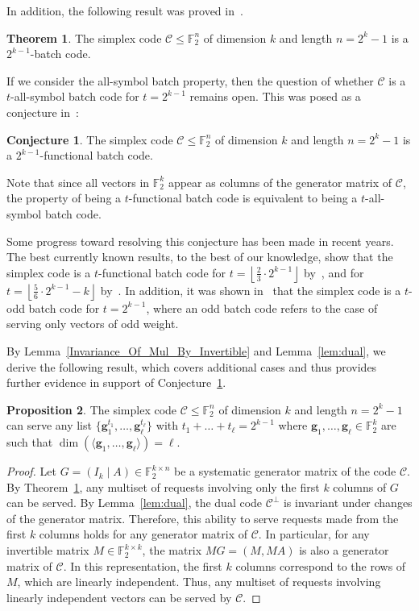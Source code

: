 \documentclass[11pt,a4paper]{article}
\theoremstyle{definition}
\newtheorem{theorem}{Theorem}
\newtheorem{proposition}[theorem]{Proposition}
\newtheorem{conjecture}{Conjecture}
\newcommand{\bfg}{{\boldsymbol g}}
\newcommand{\F}{\mathbb{F}}
\newcommand{\mC}{\mathcal{C}}
\begin{document}
In addition, the following result was proved in~\cite[Lemma 12]{wang2017switch}.

\begin{theorem} \label{thm:simba}
The simplex code $\mC \le \F_2^n$ of dimension $k$ and length $n=2^k-1$ is a $2^{k-1}$-batch code.
\end{theorem}

If we consider the all-symbol batch property, then the question of whether $\mC$ is a $t$-all-symbol batch code for $t=2^{k-1}$ remains open. This was posed as a conjecture in~\cite{YAAKOBI2020}:

\begin{conjecture} \label{conj:eit}
    The simplex code $\mC \le \F_2^n$ of dimension $k$ and length $n=2^k-1$ is a $2^{k-1}$-functional batch code.
\end{conjecture}

Note that since all vectors in $\F_2^k$ appear as columns of the generator matrix of $\mC$, the property of being a $t$-functional batch code is equivalent to being a $t$-all-symbol batch code.

Some progress toward resolving this conjecture has been made in recent years. The best currently known results, to the best of our knowledge, show that the simplex code is a $t$-functional batch code for $t=\left\lfloor \frac{2}{3}\cdot 2^{k-1}\right\rfloor $
by~\cite{yohananov2021}, and for
$
t=\left\lfloor \frac{5}{6}\cdot 2^{k-1}-k \right\rfloor$
by~\cite{yohananov2022}. In addition, it was shown in~\cite{hollmann2023} that the simplex code is a $t$-odd batch code for $t=2^{k-1}$, where an odd batch code refers to the case of serving only vectors of odd weight.


By Lemma~\ref{Invariance_Of_Mul_By_Invertible} and Lemma~\ref{lem:dual}, we derive the following result, which covers additional cases and thus provides further evidence in support of Conjecture~\ref{conj:eit}.

\begin{proposition}
    The simplex code $\mC \le \F_2^n$ of dimension $k$ and length $n=2^k-1$ can serve any list $\{\bfg_1^{t_1},\dots,\bfg_\ell^{t_{\ell}}\}$ with $t_1+\dots+t_{\ell} = 2^{k-1}$ where $\bfg_1,\dots,\bfg_\ell \in \F_2^k$ are such that $\dim(\langle\bfg_1,\dots,\bfg_\ell\rangle)=\ell$. 
\end{proposition}
\begin{proof}
    Let $G = (I_k \mid A) \in \mathbb{F}_2^{k \times n}$ be a systematic generator matrix of the code $\mathcal{C}$. By Theorem~\ref{thm:simba}, any multiset of requests involving only the first $k$ columns of $G$ can be served. By Lemma~\ref{lem:dual}, the dual code $\mathcal{C}^\perp$ is invariant under changes of the generator matrix. Therefore, this ability to serve requests made from the first $k$ columns holds for any generator matrix of $\mathcal{C}$. In particular, for any invertible matrix $M \in \mathbb{F}_2^{k \times k}$, the matrix $MG = (M, MA)$ is also a generator matrix of $\mathcal{C}$. In this representation, the first $k$ columns correspond to the rows of $M$, which are linearly independent. Thus, any multiset of requests involving linearly independent vectors can be served by $\mathcal{C}$.
\end{proof}
\end{document}
